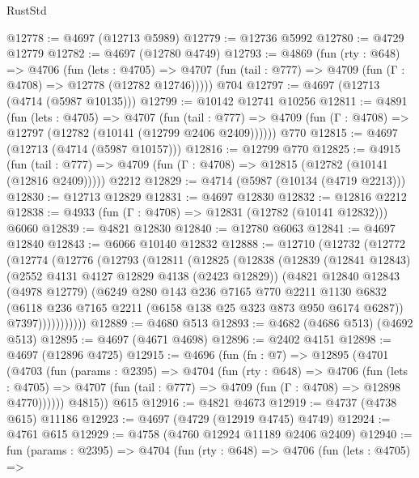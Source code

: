 \begin{lexlean}{RustStd}
\begin{coremodule}
@12778 := @4697 (@12713 @5989)
@12779 := @12736 @5992
@12780 := @4729 @12779
@12782 := @4697 (@12780 @4749)
@12793 := @4869
    (fun (rty : @648) =>
    @4706
      (fun (lets : @4705) =>
      @4707 (fun (tail : @777) => @4709 (fun (Γ : @4708) => @12778 (@12782 @12746)))))
    @704
@12797 := @4697 (@12713 (@4714 (@5987 @10135)))
@12799 := @10142 @12741 @10256
@12811 := @4891
    (fun (lets : @4705) =>
    @4707
      (fun (tail : @777) =>
      @4709 (fun (Γ : @4708) => @12797 (@12782 (@10141 (@12799 @2406 @2409))))))
    @770
@12815 := @4697 (@12713 (@4714 (@5987 @10157)))
@12816 := @12799 @770
@12825 := @4915
    (fun (tail : @777) => @4709 (fun (Γ : @4708) => @12815 (@12782 (@10141 (@12816 @2409)))))
    @2212
@12829 := @4714 (@5987 (@10134 (@4719 @2213)))
@12830 := @12713 @12829
@12831 := @4697 @12830
@12832 := @12816 @2212
@12838 := @4933 (fun (Γ : @4708) => @12831 (@12782 (@10141 @12832))) @6060
@12839 := @4821 @12830
@12840 := @12780 @6063
@12841 := @4697 @12840
@12843 := @6066 @10140 @12832
@12888 := @12710
    (@12732
      (@12772
        (@12774
          (@12776
            (@12793
              (@12811
                (@12825
                  (@12838
                    (@12839
                      (@12841 @12843)
                      (@2552 @4131 @4127 @12829 @4138 (@2423 @12829))
                      (@4821
                        @12840
                        @12843
                        (@4978 @12779)
                        (@6249
                          @280
                          @143
                          @236
                          @7165
                          @770
                          @2211
                          @1130
                          @6832
                          (@6118 @236 @7165 @2211 (@6158 @138 @25 @323 @873 @950 @6174 @6287))
                          @7397)))))))))))
@12889 := @4680 @513
@12893 := @4682 (@4686 @513) (@4692 @513)
@12895 := @4697 (@4671 @4698)
@12896 := @2402 @4151
@12898 := @4697 (@12896 @4725)
@12915 := @4696
    (fun (fn : @7) =>
    @12895
      (@4701
        (@4703
          (fun (params : @2395) =>
          @4704
            (fun (rty : @648) =>
            @4706
              (fun (lets : @4705) =>
              @4707 (fun (tail : @777) => @4709 (fun (Γ : @4708) => @12898 @4770))))))
        @4815))
    @615
@12916 := @4821 @4673
@12919 := @4737 (@4738 @615) @11186
@12923 := @4697 (@4729 (@12919 @4745) @4749)
@12924 := @4761 @615
@12929 := @4758 (@4760 @12924 @11189 @2406 @2409)
@12940 := fun (params : @2395) =>
  @4704
    (fun (rty : @648) =>
    @4706
      (fun (lets : @4705) =>

\end{coremodule}
\end{lexlean}
